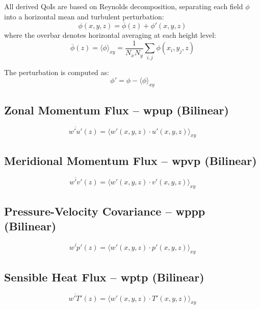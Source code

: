 \documentclass[11pt,a4paper]{article}
\begin{document}
All derived QoIs are based on Reynolds decomposition, separating each field $\phi$ into a horizontal mean and turbulent perturbation:
\begin{equation}
    \phi(x, y, z) = \overline{\phi}(z) + \phi'(x, y, z)
\end{equation}
where the overbar denotes horizontal averaging at each height level:
\begin{equation}
    \overline{\phi}(z) = \langle \phi \rangle_{xy} = \frac{1}{N_x N_y} \sum_{i,j} \phi(x_i, y_j, z)
\end{equation}

The perturbation is computed as:
\begin{equation}
    \phi' = \phi - \langle \phi \rangle_{xy}
\end{equation}

\subsection{Zonal Momentum Flux -- wpup (Bilinear)}
\begin{equation}
    \overline{w'u'}(z) = \langle w'(x,y,z) \cdot u'(x,y,z) \rangle_{xy}
\end{equation}

\subsection{Meridional Momentum Flux -- wpvp (Bilinear)}
\begin{equation}
    \overline{w'v'}(z) = \langle w'(x,y,z) \cdot v'(x,y,z) \rangle_{xy}
\end{equation}

\subsection{Pressure-Velocity Covariance -- wppp (Bilinear)}
\begin{equation}
    \overline{w'p'}(z) = \langle w'(x,y,z) \cdot p'(x,y,z) \rangle_{xy}
\end{equation}

\subsection{Sensible Heat Flux -- wptp (Bilinear)}
\begin{equation}
    \overline{w'T'}(z) = \langle w'(x,y,z) \cdot T'(x,y,z) \rangle_{xy}
\end{equation}
\end{document}
